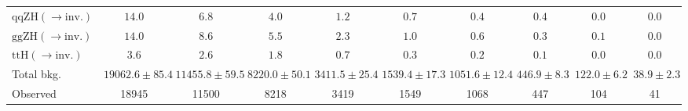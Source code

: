 \begin{tabular}{l|c|c|c|c|c|c|c|c|c}
$\mathrm{qqZH}(\rightarrow \mathrm{inv.})$  & $14.0 $ & $6.8 $ & $4.0 $ & $1.2 $ & $0.7 $ & $0.4 $ & $0.4 $ & $0.0 $ & $0.0 $\\
$\mathrm{ggZH}(\rightarrow \mathrm{inv.})$  & $14.0 $ & $8.6 $ & $5.5 $ & $2.3 $ & $1.0 $ & $0.6 $ & $0.3 $ & $0.1 $ & $0.0 $\\
$\mathrm{ttH}(\rightarrow \mathrm{inv.})$  & $3.6 $ & $2.6 $ & $1.8 $ & $0.7 $ & $0.3 $ & $0.2 $ & $0.1 $ & $0.0 $ & $0.0 $\\
\hline
Total bkg.  & $19062.6\pm85.4$ & $11455.8\pm59.5$ & $8220.0\pm50.1$ & $3411.5\pm25.4$ & $1539.4\pm17.3$ & $1051.6\pm12.4$ & $446.9\pm8.3$ & $122.0\pm6.2$ & $38.9\pm2.3$\\
\hline
Observed & 18945 & 11500 & 8218 & 3419 & 1549 & 1068 & 447 & 104 & 41\\
\hline
\end{tabular}
